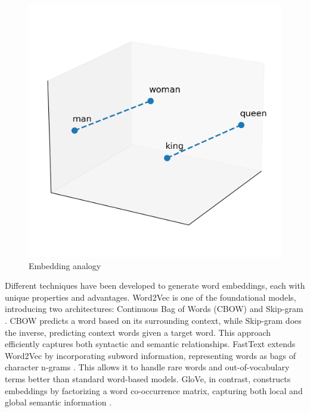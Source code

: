 \documentclass[english,version-2020-11]{uzl-thesis}
\begin{document}
\begin{figure}[h!]
    \centering
    \includegraphics[width=\textwidth]{embedding_analogy.png}
    \caption{Embedding analogy}
    \label{fig:embedding_analogy}
\end{figure}
\FloatBarrier

Different techniques have been developed to generate word embeddings, each with unique properties and advantages. Word2Vec is one of the foundational models, introducing two architectures: Continuous Bag of Words (CBOW) and Skip-gram \cite{Mikolov2013}. CBOW predicts a word based on its surrounding context, while Skip-gram does the inverse, predicting context words given a target word. This approach efficiently captures both syntactic and semantic relationships. FastText extends Word2Vec by incorporating subword information, representing words as bags of character n-grams \cite{Bojanowski2017}. This allows it to handle rare words and out-of-vocabulary terms better than standard word-based models. GloVe, in contrast, constructs embeddings by factorizing a word co-occurrence matrix, capturing both local and global semantic information \cite{Pennington2014}.
\end{document}
